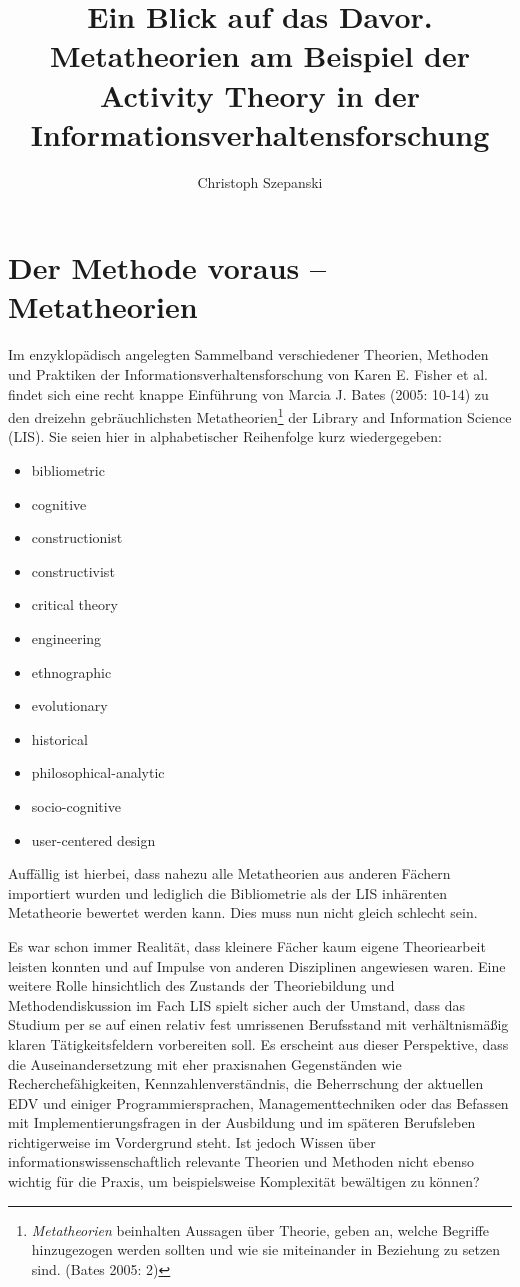 \documentclass[a4paper,
fontsize=11pt,
oneside,
numbers=noperiodatend,
parskip=half-,
bibliography=totoc,
final
]{scrartcl}
\title{\LARGE{Ein Blick auf das Davor. Metatheorien am Beispiel der Activity Theory in der Informationsverhaltensforschung}} %
\author{Christoph Szepanski} %
\date{}
\begin{document}
\maketitle
\thispagestyle{fancyplain} 


\section*{Der Methode voraus --
Metatheorien}\label{der-methode-voraus-metatheorien}

Im enzyklopädisch angelegten Sammelband verschiedener Theorien, Methoden
und Praktiken der Informationsverhaltensforschung von Karen E. Fisher et
al. findet sich eine recht knappe Einführung von Marcia J. Bates (2005:
10-14) zu den dreizehn gebräuchlichsten Metatheorien\footnote{\emph{Metatheorien}
  beinhalten Aussagen über Theorie, geben an, welche Begriffe
  hinzugezogen werden sollten und wie sie miteinander in Beziehung zu
  setzen sind. (Bates 2005: 2)} der Library and Information Science
(LIS). Sie seien hier in alphabetischer Reihenfolge kurz wiedergegeben:

\begin{itemize}
\itemsep1pt\parskip0pt
\item
  bibliometric
\item
  cognitive
\item
  constructionist
\item
  constructivist
\item
  critical theory
\item
  engineering
\item
  ethnographic
\item
  evolutionary
\item
  historical
\item
  philosophical-analytic
\item
  socio-cognitive
\item
  user-centered design
\end{itemize}

Auffällig ist hierbei, dass nahezu alle Metatheorien aus anderen Fächern
importiert wurden und lediglich die Bibliometrie als der LIS inhärenten
Metatheorie bewertet werden kann. Dies muss nun nicht gleich schlecht
sein.

Es war schon immer Realität, dass kleinere Fächer kaum eigene
Theoriearbeit leisten konnten und auf Impulse von anderen Disziplinen
angewiesen waren. Eine weitere Rolle hinsichtlich des Zustands der
Theoriebildung und Methodendiskussion im Fach LIS spielt sicher auch der
Umstand, dass das Studium per se auf einen relativ fest umrissenen
Berufsstand mit verhältnismäßig klaren Tätigkeitsfeldern vorbereiten
soll. Es erscheint aus dieser Perspektive, dass die Auseinandersetzung
mit eher praxisnahen Gegenständen wie Recherchefähigkeiten,
Kennzahlenverständnis, die Beherrschung der aktuellen EDV und einiger
Programmiersprachen, Managementtechniken oder das Befassen mit
Implementierungsfragen in der Ausbildung und im späteren Berufsleben
richtigerweise im Vordergrund steht. Ist jedoch Wissen über
informationswissenschaftlich relevante Theorien und Methoden nicht
ebenso wichtig für die Praxis, um beispielsweise Komplexität bewältigen
zu können?
\end{document}

